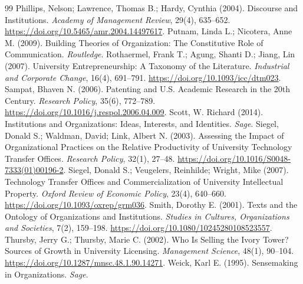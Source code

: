 \begin{thebibliography}{99}
 Phillips, Nelson; Lawrence, Thomas B.; Hardy, Cynthia (2004). Discourse and Institutions. \emph{Academy of Management Review}, 29(4), 635--652. \url{https://doi.org/10.5465/amr.2004.14497617}.
 Putnam, Linda L.; Nicotera, Anne M. (2009). Building Theories of Organization: The Constitutive Role of Communication. \emph{Routledge}.
 Rothaermel, Frank T.; Agung, Shanti D.; Jiang, Lin (2007). University Entrepreneurship: A Taxonomy of the Literature. \emph{Industrial and Corporate Change}, 16(4), 691--791. \url{https://doi.org/10.1093/icc/dtm023}.
 Sampat, Bhaven N. (2006). Patenting and U.S. Academic Research in the 20th Century. \emph{Research Policy}, 35(6), 772--789. \url{https://doi.org/10.1016/j.respol.2006.04.009}.
 Scott, W. Richard (2014). Institutions and Organizations: Ideas, Interests, and Identities. \emph{Sage}.
 Siegel, Donald S.; Waldman, David; Link, Albert N. (2003). Assessing the Impact of Organizational Practices on the Relative Productivity of University Technology Transfer Offices. \emph{Research Policy}, 32(1), 27--48. \url{https://doi.org/10.1016/S0048-7333(01)00196-2}.
 Siegel, Donald S.; Veugelers, Reinhilde; Wright, Mike (2007). Technology Transfer Offices and Commercialization of University Intellectual Property. \emph{Oxford Review of Economic Policy}, 23(4), 640--660. \url{https://doi.org/10.1093/oxrep/grm036}.
 Smith, Dorothy E. (2001). Texts and the Ontology of Organizations and Institutions. \emph{Studies in Cultures, Organizations and Societies}, 7(2), 159--198. \url{https://doi.org/10.1080/10245280108523557}.
 Thursby, Jerry G.; Thursby, Marie C. (2002). Who Is Selling the Ivory Tower? Sources of Growth in University Licensing. \emph{Management Science}, 48(1), 90--104. \url{https://doi.org/10.1287/mnsc.48.1.90.14271}.
 Weick, Karl E. (1995). Sensemaking in Organizations. \emph{Sage}.
\end{thebibliography}